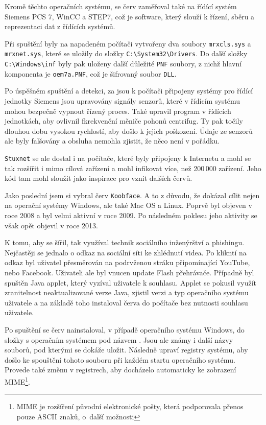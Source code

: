\documentclass[a4paper,12pt]{article}
\begin{document}
Kromě těchto operačních systému, se červ zaměřoval také na řídící systém Siemens PCS 7, WinCC a STEP7, což je software, který slouží k řízení, sběru a reprezentaci dat z řídících systémů\cite{stuxnet-nordvpn}.

Při spuštění byly na napadeném počítači vytvořeny dva soubory \texttt{mrxcls.sys} a \texttt{mrxnet.sys}, které se uložily do složky \texttt{C:\textbackslash System32\textbackslash Drivers}. Do další složky \texttt{C:\textbackslash Win\-dows\textbackslash inf} byly pak uloženy další důležité \texttt{PNF} soubory, z nichž hlavní komponenta je \texttt{oem7a.PNF}, což je šifrovaný soubor \texttt{DLL}.\cite{stuxnet-fsecure}

Po úspěšném spuštění a detekci, za jsou k počítači připojeny systémy pro řídící jednotky Siemens jsou upravovány signály senzorů, které v řídícím systému mohou bezpečně vypnout řízený proces. Také upravil program v řídících jednotkách, aby ovlivnil fkrekvenční měniče pohonů centrifug. Ty pak točily dlouhou dobu vysokou rychlostí, aby došlo k jejich poškození. Údaje ze senzorů ale byly falšovány a obsluha nemohla zjistit, že něco není v pořádku.\cite{stuxnet-nordvpn}\cite{stuxnet-avast}

\texttt{Stuxnet} se ale dostal i na počítače, které byly připojeny k Internetu a mohl se tak rozšířit i mimo cílová zařízení a mohl infikovat více, než 200\,000 zařízení\cite{stuxnet-zdnet}. Jeho kód tam mohl sloužit jako inspirace pro vznit dalších červů\cite{stuxnet-avast}.

Jako poslední jsem si vybral červ \texttt{Koobface}. A to z důvodu, že dokázal cílit nejen na operační systémy Windows, ale také Mac OS a Linux. Poprvě byl objeven v roce 2008 a byl velmi aktivní v roce 2009. Po následném poklesu jeho aktivity se však opět objevil v roce 2013.\cite{koobface-kaspersky}

K tomu, aby se šířil, tak využíval technik sociálního inženýrštví a phishingu. Nejčastěji se jednalo o odkaz na sociální síti ke zhlédnutí videa. Po klikntí na odkaz byl uživatel přesměrován na podrvženou stráku připomínající YouTube, nebo Facebook. Uživateli ale byl vnucen update Flash přehrávače\cite{koobface-naked}. Případně byl spuštěn Java applet, který vyzíval uživatele k souhlasu. Applet se pokusil využít zranitelnost neaktualizované verze Java, zjistil verzi a typ operačního systému uživatele a na základě toho instaloval červa do počítače bez nutnosti souhlasu uživatele\cite{koobface-softpedia}.

Po spuštění se červ nainstaloval, v případě operačního systému Windows, do složky s operačním systémem pod názvem \cite{koobface-fsecure}. Jsou ale známy i další názvy souborů, pod kterými se dokáže uložit\cite{koobface-kaspersky}. Následně upraví registry systému, aby došlo ke spouštění tohoto souboru při každém startu operačního systému. Provede také změnu v registrech, aby docházelo automaticky ke zobrazení MIME\footnote{MIME je rozšíření původní elektronické pošty, která podporovala přenos pouze ASCII znaků, o~další možnosti}\cite{koobface-fsecure}.
\end{document}
